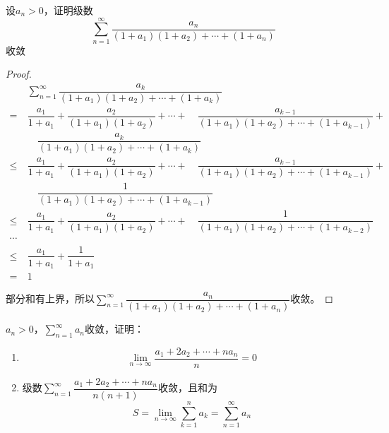 \begin{proposition}
    
    设$a_n > 0$，证明级数
    $$\sum\limits_{n=1}^{\infty}{\dfrac{a_n}{(1 + a_1)(1 + a_2) + \cdots + (1 + a_n)}}$$
    收敛

\end{proposition}

\begin{proof}
    
    \begin{align*}
        &\sum\limits_{n=1}^{\infty}{\dfrac{a_k}{(1 + a_1)(1 + a_2) + \cdots + (1 + a_k)}} \\
        = \  & \dfrac{a_1}{1 + a_1} + \dfrac{a_2}{(1 + a_1)(1 + a_2)} + \cdots + \quad \dfrac{a_{k-1}}{(1 + a_1)(1 + a_2) + \cdots + (1 + a_{k-1})} + \\
        & \quad \dfrac{a_k}{(1 + a_1)(1 + a_2) + \cdots + (1 + a_k)} \\
        \leq \ & \dfrac{a_1}{1 + a_1} + \dfrac{a_2}{(1 + a_1)(1 + a_2)} + \cdots + \quad \dfrac{a_{k-1}}{(1 + a_1)(1 + a_2) + \cdots + (1 + a_{k-1})} + \\
        & \quad \dfrac{1}{(1 + a_1)(1 + a_2) + \cdots + (1 + a_{k-1})} \\
        \leq \ & \dfrac{a_1}{1 + a_1} + \dfrac{a_2}{(1 + a_1)(1 + a_2)} + \cdots + \quad \dfrac{1}{(1 + a_1)(1 + a_2) + \cdots + (1 + a_{k-2})} \\
        \cdots & \\
        \leq \ & \dfrac{a_1}{1 + a_1} + \dfrac{1}{1 + a_1} \\
        = \ & 1 
    \end{align*}

    部分和有上界，所以$\sum\limits_{n=1}^{\infty}{\dfrac{a_n}{(1 + a_1)(1 + a_2) + \cdots + (1 + a_n)}}$收敛。

\end{proof}

\begin{proposition}
    
    $a_n > 0$，$\sum\limits_{n=1}^{\infty}{a_n}$收敛，证明：

    \begin{enumerate}
        
        \item 
                $$\lim\limits_{n\to\infty}{\dfrac{a_1 + 2a_2 + \cdots + na_n}{n}} = 0$$
        
        \item   
                级数$\sum\limits_{n=1}^{\infty}{\dfrac{a_1 + 2a_2 + \cdots + na_n}{n(n+1)}}$收敛，且和为
                $$S = \lim\limits_{n\to\infty}{\sum\limits_{k=1}^{n}{a_k}} = \sum\limits_{n=1}^{\infty}{a_n}$$

    \end{enumerate}

\end{proposition}

